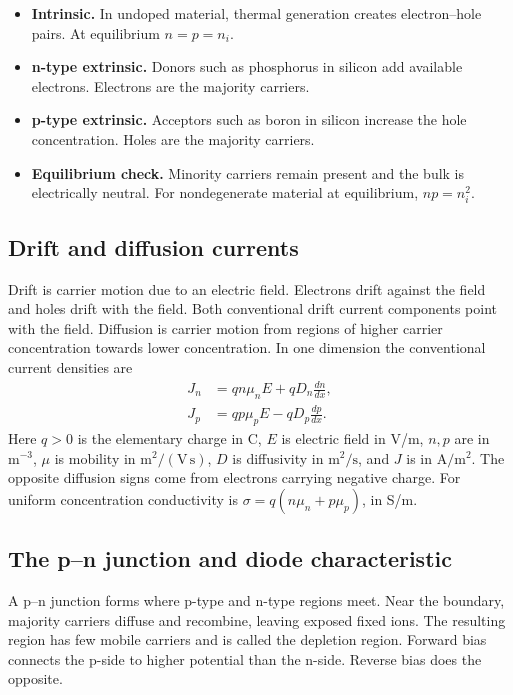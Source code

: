 \documentclass[12pt,a4paper]{article}
\begin{document}
\begin{itemize}[leftmargin=*, itemsep=3pt, topsep=4pt]
  \item \textbf{Intrinsic.} In undoped material, thermal generation creates electron--hole pairs. At equilibrium \(n=p=n_i\).
  \item \textbf{n-type extrinsic.} Donors such as phosphorus in silicon add available electrons. Electrons are the majority carriers.
  \item \textbf{p-type extrinsic.} Acceptors such as boron in silicon increase the hole concentration. Holes are the majority carriers.
  \item \textbf{Equilibrium check.} Minority carriers remain present and the bulk is electrically neutral. For nondegenerate material at equilibrium, \(np=n_i^2\).
\end{itemize}

\subsection{Drift and diffusion currents}
Drift is carrier motion due to an electric field. Electrons drift against the field and holes drift with the field. Both conventional drift current components point with the field. Diffusion is carrier motion from regions of higher carrier concentration towards lower concentration. In one dimension the conventional current densities are
\[
\begin{aligned}
J_n &= q n\mu_n E+q D_n \frac{dn}{dx},\\
J_p &= q p\mu_p E-q D_p \frac{dp}{dx}.
\end{aligned}
\]
Here \(q>0\) is the elementary charge in C, \(E\) is electric field in V/m, \(n,p\) are in \(\mathrm{m^{-3}}\), \(\mu\) is mobility in \(\mathrm{m^2/(V\,s)}\), \(D\) is diffusivity in \(\mathrm{m^2/s}\), and \(J\) is in \(\mathrm{A/m^2}\). The opposite diffusion signs come from electrons carrying negative charge. For uniform concentration conductivity is \(\sigma=q(n\mu_n+p\mu_p)\), in S/m.

\subsection{The p--n junction and diode characteristic}
\begin{tcolorbox}[defbox,title={Depletion region and bias}]
A p--n junction forms where p-type and n-type regions meet. Near the boundary, majority carriers diffuse and recombine, leaving exposed fixed ions. The resulting region has few mobile carriers and is called the depletion region. Forward bias connects the p-side to higher potential than the n-side. Reverse bias does the opposite.
\end{tcolorbox}
\end{document}
